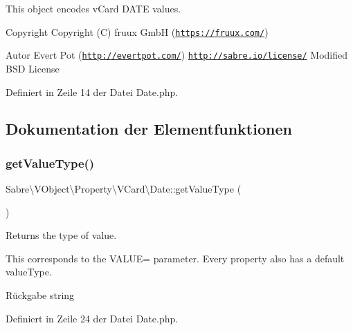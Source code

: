 This object encodes v\+Card D\+A\+TE values.

\begin{DoxyCopyright}{Copyright}
Copyright (C) fruux GmbH (\href{https://fruux.com/}{\tt https\+://fruux.\+com/}) 
\end{DoxyCopyright}
\begin{DoxyAuthor}{Autor}
Evert Pot (\href{http://evertpot.com/}{\tt http\+://evertpot.\+com/})  \href{http://sabre.io/license/}{\tt http\+://sabre.\+io/license/} Modified B\+SD License 
\end{DoxyAuthor}


Definiert in Zeile 14 der Datei Date.\+php.



\subsection{Dokumentation der Elementfunktionen}
\mbox{\label{class_sabre_1_1_v_object_1_1_property_1_1_v_card_1_1_date_acd0e0c5270cd5e24967720007009d1fc}} 
\subsubsection{\texorpdfstring{get\+Value\+Type()}{getValueType()}}
{\footnotesize\ttfamily Sabre\textbackslash{}\+V\+Object\textbackslash{}\+Property\textbackslash{}\+V\+Card\textbackslash{}\+Date\+::get\+Value\+Type (\begin{DoxyParamCaption}{ }\end{DoxyParamCaption})}

Returns the type of value.

This corresponds to the V\+A\+L\+UE= parameter. Every property also has a \textquotesingle{}default\textquotesingle{} value\+Type.

\begin{DoxyReturn}{Rückgabe}
string 
\end{DoxyReturn}


Definiert in Zeile 24 der Datei Date.\+php.

\mbox{\label{class_sabre_1_1_v_object_1_1_property_1_1_v_card_1_1_date_a2275aab00ec7ab4662e1e11d72c43878}} 
